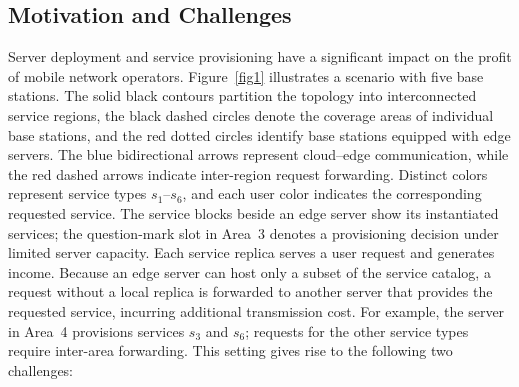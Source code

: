 \documentclass[10pt, conference, letterpaper]{IEEEtran}
\newenvironment{revision}{\begingroup\color{blue}}{\endgroup}
\newenvironment{revision}{\begingroup}{\endgroup}
\begin{document}
\subsection{Motivation and Challenges}
\begin{revision}
Server deployment and service provisioning have a significant impact on the profit of mobile network operators. Figure~\ref{fig1} illustrates a scenario with five base stations. The solid black contours partition the topology into interconnected service regions, the black dashed circles denote the coverage areas of individual base stations, and the red dotted circles identify base stations equipped with edge servers. The blue bidirectional arrows represent cloud--edge communication, while the red dashed arrows indicate inter-region request forwarding. Distinct colors represent service types $s_1$--$s_6$, and each user color indicates the corresponding requested service. The service blocks beside an edge server show its instantiated services; the question-mark slot in Area~3 denotes a provisioning decision under limited server capacity.
Each service replica serves a user request and generates income. Because an edge server can host only a subset of the service catalog, a request without a local replica is forwarded to another server that provides the requested service, incurring additional transmission cost. For example, the server in Area~4 provisions services $s_3$ and $s_6$; requests for the other service types require inter-area forwarding. This setting gives rise to the following two challenges:
\end{revision}
\end{document}
